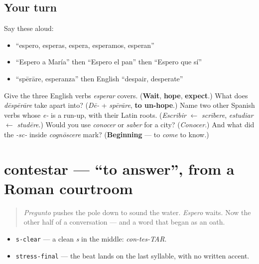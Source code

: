 \subsection*{Your turn}
Say these aloud:

\begin{itemize}
\raggedright
  \item \textquotedblleft{}espero, esperas, espera, esperamos, esperan\textquotedblright{}
  \item \textquotedblleft{}Espero a María\textquotedblright{} then \textquotedblleft{}Espero el pan\textquotedblright{} then \textquotedblleft{}Espero que sí\textquotedblright{}
  \item \textquotedblleft{}spērāre, esperanza\textquotedblright{} then English \textquotedblleft{}despair, desperate\textquotedblright{}
\end{itemize}

\begin{tcolorbox}[breakable,colback=teal!4,colframe=teal!35!black,title={Before you move on}]
Give the three English verbs \emph{esperar} covers. (\textbf{Wait}, \textbf{hope}, \textbf{expect}.) What does \emph{dēspērāre} take apart into? (\emph{Dē-} + \emph{spērāre}, \textbf{to un-hope}.) Name two other Spanish verbs whose \emph{e-} is a run-up, with their Latin roots. (\emph{Escribir} $\leftarrow$ \emph{scrībere}, \emph{estudiar} $\leftarrow$ \emph{studēre}.) Would you use \emph{conocer} or \emph{saber} for a city? (\emph{Conocer}.) And what did the \emph{-sc-} inside \emph{cognōscere} mark? (\textbf{Beginning} — to \emph{come} to know.)
\end{tcolorbox}
\section[contestar]{contestar — \textquotedblleft{}to answer\textquotedblright{}, from a Roman courtroom}

\label{lesson:ES-C40-contestar}



\begin{quote}
\emph{Pregunto} pushes the pole down to sound the water. \emph{Espero} waits. Now the other half of a conversation — and a word that began as an oath.
\end{quote}

\begin{sounds}
\begin{itemize}
\raggedright
  \item \texttt{s-clear} — a clean \emph{s} in the middle: \emph{con-tes-TAR}.
  \item \texttt{stress-final} — the beat lands on the last syllable, with no written accent.
\end{itemize}
\end{sounds}

